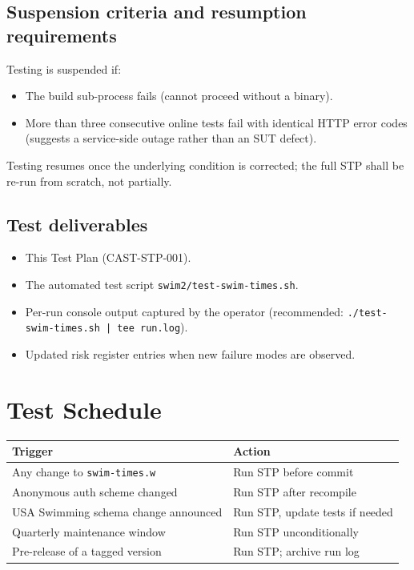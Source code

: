 \documentclass[12pt]{article}
\newcommand{\code}[1]{\texttt{#1}}
\begin{document}
\subsection{Suspension criteria and resumption requirements}

Testing is suspended if:

\begin{itemize}
  \item The build sub-process fails (cannot proceed without a
        binary).
  \item More than three consecutive online tests fail with
        identical HTTP error codes (suggests a service-side
        outage rather than an SUT defect).
\end{itemize}

Testing resumes once the underlying condition is corrected; the
full STP shall be re-run from scratch, not partially.

\subsection{Test deliverables}

\begin{itemize}
  \item This Test Plan (CAST-STP-001).
  \item The automated test script \code{swim2/test-swim-times.sh}.
  \item Per-run console output captured by the operator
        (recommended: \code{./test-swim-times.sh | tee run.log}).
  \item Updated risk register entries when new failure modes
        are observed.
\end{itemize}

\section{Test Schedule}

\begin{center}
\begin{tabular}{ll}
  \toprule
  \textbf{Trigger}                              & \textbf{Action}                  \\
  \midrule
  Any change to \code{swim-times.w}             & Run STP before commit            \\
  Anonymous auth scheme changed                 & Run STP after recompile          \\
  USA Swimming schema change announced          & Run STP, update tests if needed  \\
  Quarterly maintenance window                  & Run STP unconditionally          \\
  Pre-release of a tagged version               & Run STP; archive run log         \\
  \bottomrule
\end{tabular}
\end{center}
\end{document}
